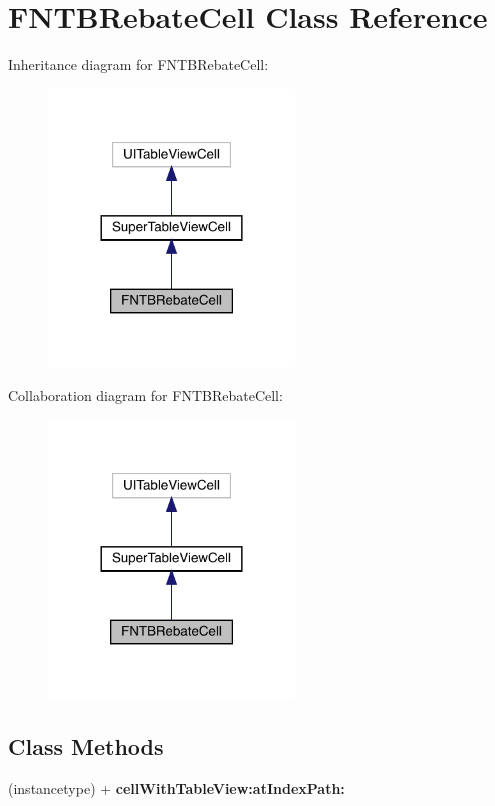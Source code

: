 \hypertarget{interface_f_n_t_b_rebate_cell}{}\section{F\+N\+T\+B\+Rebate\+Cell Class Reference}
\label{interface_f_n_t_b_rebate_cell}


Inheritance diagram for F\+N\+T\+B\+Rebate\+Cell\+:\nopagebreak
\begin{figure}[H]
\begin{center}
\leavevmode
\includegraphics[width=185pt]{interface_f_n_t_b_rebate_cell__inherit__graph}
\end{center}
\end{figure}


Collaboration diagram for F\+N\+T\+B\+Rebate\+Cell\+:\nopagebreak
\begin{figure}[H]
\begin{center}
\leavevmode
\includegraphics[width=185pt]{interface_f_n_t_b_rebate_cell__coll__graph}
\end{center}
\end{figure}
\subsection*{Class Methods}
\begin{DoxyCompactItemize}
\item 
\mbox{\label{interface_f_n_t_b_rebate_cell_ad2f67d297cf40dc9ba499e2f83c5e7d6}} 
(instancetype) + {\bfseries cell\+With\+Table\+View\+:at\+Index\+Path\+:}
\end{DoxyCompactItemize}
